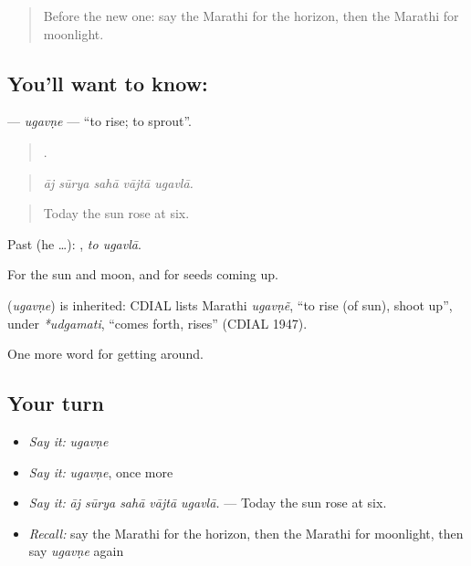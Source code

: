 \label{lesson:MR-C441-ugavne}



\begin{quote}
Before the new one: say the Marathi for the horizon, then the Marathi for moonlight.
\end{quote}

\subsection*{You'll want to know: }
\textbf{} — \emph{ugavṇe} — \textquotedblleft{}to rise; to sprout\textquotedblright{}.

\begin{quote}
    .
\end{quote}

\begin{quote}
\emph{āj sūrya sahā vājtā ugavlā.}
\end{quote}

\begin{quote}
Today the sun rose at six.
\end{quote}

Past (he …):  , \emph{to ugavlā}.

For the sun and moon, and for seeds coming up.

\begin{cousinweb}
\textbf{} (\emph{ugavṇe}) is inherited: CDIAL lists Marathi \emph{ugavṇẽ}, \textquotedblleft{}to rise (of sun), shoot up\textquotedblright{}, under \emph{*udgamati}, \textquotedblleft{}comes forth, rises\textquotedblright{} (CDIAL 1947).
\end{cousinweb}

\begin{grammarlens}[title={What you've built}]
One more word for getting around.
\end{grammarlens}

\subsection*{Your turn}
\begin{itemize}
\raggedright
  \item \emph{Say it:} \emph{ugavṇe}
  \item \emph{Say it:} \emph{ugavṇe}, once more
  \item \emph{Say it:} \emph{āj sūrya sahā vājtā ugavlā.} — Today the sun rose at six.
  \item \emph{Recall:} say the Marathi for the horizon, then the Marathi for moonlight, then say \emph{ugavṇe} again
\end{itemize}

